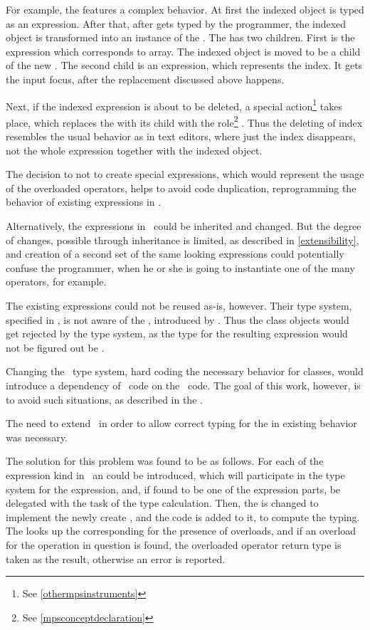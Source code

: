 For example,  the  features a complex behavior. At first the indexed 
object is typed as an expression. After that, after \cc{[} gets typed by the programmer,
the indexed object is transformed into an instance of the 
. The  has two children. First is the expression
which corresponds to array. The indexed object is moved to be a child of the new .
The second child is an expression, which represents the index. It gets the input focus,
after the replacement discussed above happens.

Next, if the indexed expression is about to be deleted, a special action\footnote{See \ref{othermpsinstruments}}
takes place, which replaces the  with its child with the role\footnote{See \ref{mpsconceptdeclaration}}
. Thus the deleting of index resembles the usual behavior as in text editors, where
just the index disappears, not the whole expression together with the indexed object.

The decision to not to create special expressions, which would represent the usage of
the overloaded operators, helps to avoid code duplication, reprogramming the behavior of
existing expressions in \mbdr. 

Alternatively, the expressions in \mbdr\ could be inherited and changed. But the 
degree of changes, possible through inheritance is limited, as described in \ref{extensibility},
and creation of a second set of the same looking expressions could potentially confuse the
programmer, when he or she is going to instantiate one of the many \cc{+} operators, for example.

The existing expressions could not be reused as-is, however. Their type system, specified
in \mbdr, is not aware of the , introduced by \pcpp. Thus the class
objects would get rejected by the type system, as the type for the resulting expression
would not be figured out be \mbdr.

Changing the \mbdr\ type system, hard coding the necessary behavior for classes, would 
introduce a dependency of \mbdr\ code on the \pcpp\ code. The goal of this work, however,
is to avoid such situations, as described in the .

The need to extend \mbdr\ in order to allow correct typing for the  in
existing behavior was necessary.

The solution for this problem was found to be as follows. For each of the expression kind 
in \mbdr\ an  could be introduced, which will participate in the 
type system for the expression, and, if found to be one of the expression parts, 
be delegated with the task of the type calculation. Then, the  is changed
to implement the newly create , and the code is added to it, to 
compute the typing. The  looks up the corresponding  for 
the presence of overloads, and if an overload for the operation in question is found, 
the overloaded operator return type is taken as the result, otherwise an error is reported.

